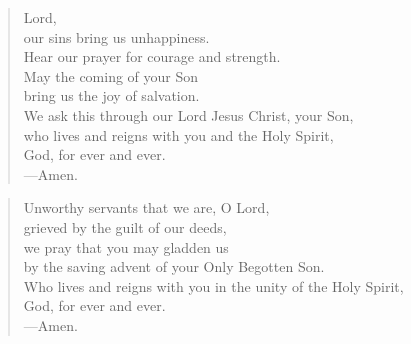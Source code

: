 \prayer

\setlength{\vleftmargin}{\prayerleftmargini}

\begin{verse}
Lord,\\
our sins bring us unhappiness.\\
Hear our prayer for courage and strength.\\
May the coming of your Son\\
bring us the joy of salvation.\\
We ask this through our Lord Jesus Christ, your Son,\\
who lives and reigns with you and the Holy Spirit,\\
God, for ever and ever.\\
{\color{red}---\thinspace}Amen.
\end{verse}


\begin{verse}
Unworthy servants that we are, O Lord,\\
grieved by the guilt of our deeds,\\
we pray that you may gladden us\\
by the saving advent of your Only Begotten Son.\\
Who lives and reigns with you in the unity of the Holy Spirit,\\
God, for ever and ever.\\
{\color{red}---\thinspace}Amen.
\end{verse}

\setlength{\vleftmargin}{\defleftmargini}
